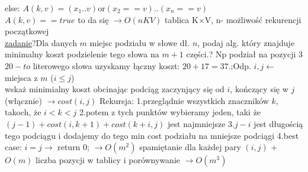 \documentclass[8pt,a3paper]{article}
\begin{document}
\begin{multicols*}{3}
{	 else: $A(k,v)=(x_{1}..v)$or$(x_{2}==v)..(x_{n}==v)$\\
	 $A(k,v)==true$ to da się $\to O(nKV)$ tablica K$\times$V, n- możliwość rekurencji początkowej\\
	 \underline{zadanie}?Dla danych $m$ miejsc podziału w słowe dł. $n$, podaj alg. który znajduje minimalny koszt podzielenie tego słowa na $m+1$ części.? Np podział na pozycji $3$ $20-to$ literowego słowa uzyskamy łączny koszt: $20+17=37$.;\quad Odp. $i,j \gets$ miejsca z $m$ ($i \leq j$)\\ wskaż minimialny koszt obcinając podciąg zaczynjący się od $i$, kończący się w $j$ (włącznie) $\to cost(i,j)$ Rekursja: 1.przeglądnie wszystkich znaczników $k$, takoch, że $i<k<j$ 2.potem z tych punktów wybieramy jeden, taki że $(j-1)+cost(i,k+1)+cost(k+i,j)$ jest najmniejsze 3.$j-i$ jest długością tego podciągu i dodajemy do tego min cost podziału na mniejsze podciągi 4.best case: $i=j \to$ return $0$; $\to O(m^{2})$ spamiętanie dla każdej pary $(i,j)$ + $O(m)$ liczba pozycji w tablicy i porównywanie $\to O(m^3)$\\
	 
	 }
	 
	 
\end{multicols*}
\end{document}
